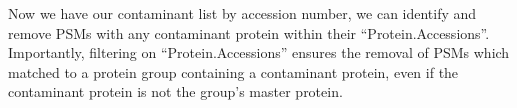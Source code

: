 \documentclass[9pt,a4paper,]{extarticle}
\newenvironment{Shaded}{\begin{snugshade}}{\end{snugshade}}
\newcommand{\AttributeTok}[1]{\textcolor[rgb]{0.77,0.63,0.00}{#1}}
\newcommand{\ConstantTok}[1]{\textcolor[rgb]{0.00,0.00,0.00}{#1}}
\newcommand{\DocumentationTok}[1]{\textcolor[rgb]{0.56,0.35,0.01}{\textbf{\textit{#1}}}}
\newcommand{\FunctionTok}[1]{\textcolor[rgb]{0.00,0.00,0.00}{#1}}
\newcommand{\NormalTok}[1]{#1}
\newcommand{\OtherTok}[1]{\textcolor[rgb]{0.56,0.35,0.01}{#1}}
\newcommand{\SpecialCharTok}[1]{\textcolor[rgb]{0.00,0.00,0.00}{#1}}
\newcommand{\StringTok}[1]{\textcolor[rgb]{0.31,0.60,0.02}{#1}}
\begin{document}
\begin{Shaded}
\end{Shaded}

Now we have our contaminant list by accession number, we can identify and remove
PSMs with any contaminant protein within their ``Protein.Accessions''.
Importantly, filtering on ``Protein.Accessions'' ensures the removal of PSMs which
matched to a protein group containing a contaminant protein, even if the
contaminant protein is not the group's master protein.
\end{document}
